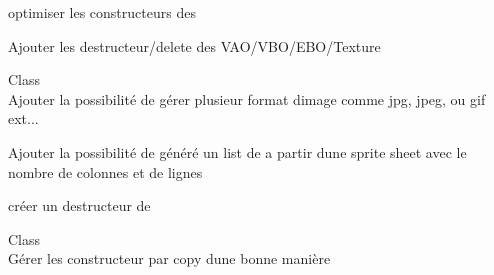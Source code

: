 \begin{DoxyRefList}
optimiser les constructeurs des  



Ajouter les destructeur/delete des VAO/\+VBO/\+EBO/\+Texture  
\item[Class \doxylink{classTexture}{Texture} ]\hfill \\
\label{todo__todo000010}%
%
Ajouter la possibilité de gérer plusieur format d\textquotesingle{}image comme jpg, jpeg, ou gif ext... 



Ajouter la possibilité de généré un list de  a partir d\textquotesingle{}une sprite sheet avec le nombre de colonnes et de lignes 



créer un destructeur de   
\item[Class \doxylink{classVector2}{Vector2\texorpdfstring{$<$}{<} T \texorpdfstring{$>$}{>}} ]\hfill \\
\label{todo__todo000001}%
%
Gérer les constructeur par copy d\textquotesingle{}une bonne manière 
\end{DoxyRefList}